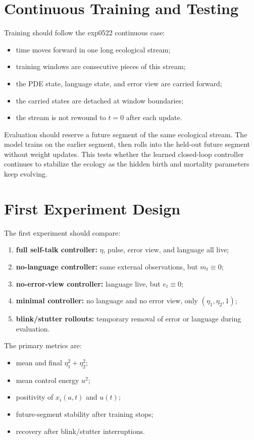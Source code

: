 \documentclass[11pt]{article}
\begin{document}
\section{Continuous Training and Testing}

Training should follow the exp0522 continuous case:
\begin{itemize}[leftmargin=2em]
  \item time moves forward in one long ecological stream;
  \item training windows are consecutive pieces of this stream;
  \item the PDE state, language state, and error view are carried forward;
  \item the carried states are detached at window boundaries;
  \item the stream is not rewound to \(t=0\) after each update.
\end{itemize}

Evaluation should reserve a future segment of the same ecological stream.
The model trains on the earlier segment, then rolls into the held-out
future segment without weight updates. This tests whether the learned
closed-loop controller continues to stabilize the ecology as the hidden
birth and mortality parameters keep evolving.

\section{First Experiment Design}

The first experiment should compare:
\begin{enumerate}[leftmargin=2em]
  \item \textbf{full self-talk controller:}
  \(\eta\), pulse, error view, and language all live;
  \item \textbf{no-language controller:}
  same external observations, but \(m_t\equiv 0\);
  \item \textbf{no-error-view controller:}
  language live, but \(e_t\equiv 0\);
  \item \textbf{minimal controller:}
  no language and no error view, only \((\eta_1,\eta_2,1)\);
  \item \textbf{blink/stutter rollouts:}
  temporary removal of error or language during evaluation.
\end{enumerate}

The primary metrics are:
\begin{itemize}[leftmargin=2em]
  \item mean and final \(\eta_1^2+\eta_2^2\);
  \item mean control energy \(u^2\);
  \item positivity of \(x_i(a,t)\) and \(u(t)\);
  \item future-segment stability after training stops;
  \item recovery after blink/stutter interruptions.
\end{itemize}
\end{document}
